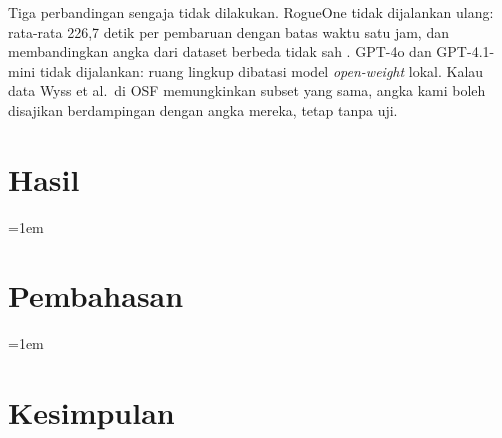 \documentclass[a4paper,fleqn]{cas-dc}
\begin{document}
Tiga perbandingan sengaja tidak dilakukan. RogueOne tidak dijalankan ulang:
rata-rata 226,7 detik per pembaruan dengan batas waktu satu jam, dan
membandingkan angka dari dataset berbeda tidak sah
\citep{sofaer2024rogueone}. GPT-4o dan GPT-4.1-mini tidak dijalankan: ruang
lingkup dibatasi model \emph{open-weight} lokal. Kalau data Wyss et al.\ di OSF
memungkinkan subset yang sama, angka kami boleh disajikan berdampingan dengan
angka mereka, tetap tanpa uji.

\section{Hasil}\label{sec:results}

\begingroup
\emergencystretch=1em

\par
\endgroup

\section{Pembahasan}\label{sec:discussion}

\begingroup
\emergencystretch=1em

\par
\endgroup

\section{Kesimpulan}\label{sec:conclusion}

\printcredits



\end{document}
